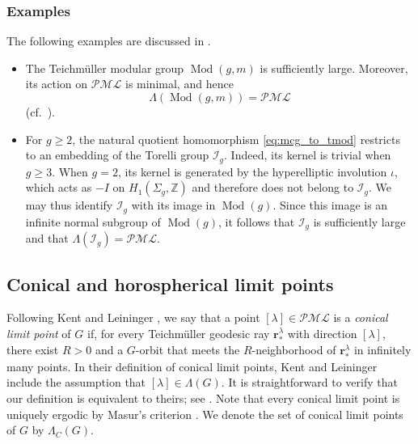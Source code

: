 \documentclass[dvipdfmx]{amsart}
\theoremstyle{remark}
\newcommand{\ext}{{\rm Ext}}
\newcommand{\tmod}{\operatorname{Mod}}
\newcommand{\torelliG}{\mathcal{I}}
\newcommand{\ray}{{\boldsymbol r}}
\newcommand{\pml}{\mathcal{PML}}
\begin{document}
\subsubsection*{Examples}
The following examples are discussed in \cite[Example 1 in \S5]{McCarthyPapadopoulos1989}.
\begin{itemize}
\item[(a)]
The Teichm\"uller modular group $\tmod(g,m)$ is sufficiently large. Moreover, its action on $\pml$ is minimal, and hence
\[
\Lambda(\tmod(g,m))=\pml
\]
(cf.\ \cite[Expos\'e 6, VII]{Fathi1979}).
\item[(b)]
For $g\ge 2$, the natural quotient homomorphism \eqref{eq:mcg_to_tmod} restricts to an embedding of the Torelli group $\torelliG_g$.
Indeed, its kernel is trivial when $g\ge 3$. When $g=2$, its kernel is generated by the hyperelliptic involution $\iota$, which acts as $-I$ on $H_1(\Sigma_g,\mathbb Z)$ and therefore does not belong to $\torelliG_g$. We may thus identify $\torelliG_g$ with its image in $\tmod(g)$. Since this image is an infinite normal subgroup of $\tmod(g)$, it follows that $\torelliG_g$ is sufficiently large and
that
$\Lambda(\torelliG_g)=\pml$.
\end{itemize}



\subsection{Conical and horospherical limit points}

Following Kent and Leininger \cite{KentLeininger2008}, we say that a point $[\lambda]\in\pml$ is a \emph{conical limit point} of $G$ if, for every Teichm\"uller geodesic ray $\ray^\lambda_*$ with direction $[\lambda]$, there exist $R>0$ and a $G$-orbit that meets the $R$-neighborhood of $\ray^\lambda_*$ in infinitely many points.
In their definition of conical limit points, Kent and Leininger include the assumption that $[\lambda]\in\Lambda(G)$. It is straightforward to verify that our definition is equivalent to theirs; see \cite{miyachi2026limitsetsmappingclass}. Note that every conical limit point is uniquely ergodic by Masur's criterion \cite{Masur1992}. We denote the set of conical limit points of $G$ by $\Lambda_C(G)$.

\end{document}

